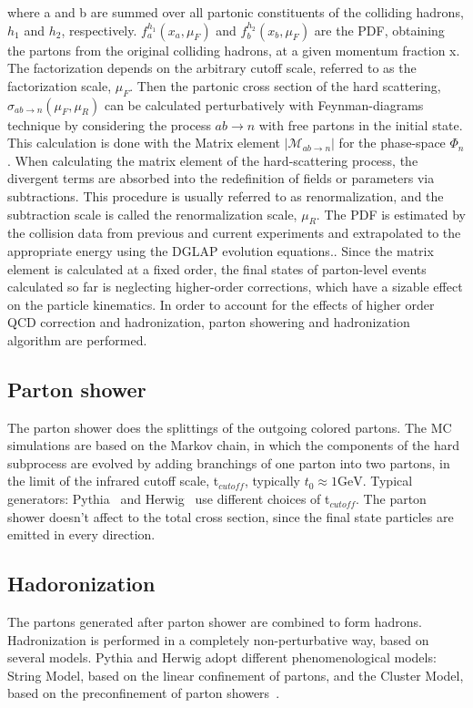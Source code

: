 where a and b are summed over all partonic constituents of the colliding hadrons, $h_1$ and $h_2$, respectively.
$f_{a}^{h_{1}}\left(x_{a}, \mu_{F}\right)$ and $f_{b}^{h_{2}}\left(x_{b}, \mu_{F}\right)$ are the PDF, obtaining the partons from the original colliding hadrons, at a given momentum fraction x. The factorization depends on the arbitrary cutoff scale, referred to as the factorization scale, $\mu_F$.
Then the partonic cross section of the hard scattering, $\hat{\sigma}_{a b \rightarrow n}\left(\mu_{F}, \mu_{R}\right)$ can be calculated perturbatively with Feynman-diagrams technique by considering the process $ab\rightarrow n $ with free partons in the initial state. This calculation is done with the Matrix element $\left|\mathcal{M}_{a b \rightarrow n}\right|$ for the phase-space $\Phi_n$.
When calculating the matrix element of the hard-scattering process, the divergent terms are absorbed into the redefinition of fields or parameters via subtractions. This procedure is usually referred to as renormalization, and the subtraction scale is called the renormalization scale, $\mu_R$. 
The PDF is estimated by the collision data from previous and current experiments and extrapolated to the appropriate energy using the DGLAP evolution equations.\cite{}.
Since the matrix element is calculated at a fixed order, the final states of parton-level events calculated so far is neglecting higher-order corrections, which have a sizable effect on the particle kinematics. In order to account for the effects of higher order QCD correction and hadronization, parton showering and hadronization algorithm are performed.

\subsection{Parton shower}
\label{subsec:partonshower}
The parton shower does the splittings of the outgoing colored partons.  The MC simulations are based on the Markov chain, in which the components of the hard subprocess are evolved by adding branchings of one parton into two partons, in the limit of the infrared cutoff scale, t$_{cutoff}$, typically $t_{0} \approx 1 \mathrm{GeV}$. 
Typical generators: Pythia~\cite{SJOSTRAND2008852} and Herwig~\cite{Gieseke2012} use different choices of t$_{cutoff}$.
The parton shower doesn't affect to the total cross section, since the final state particles are emitted in every direction.
\subsection{Hadoronization}
The partons generated after parton shower are combined to form hadrons. 
Hadronization is performed in a completely non-perturbative way, based on several models. 
Pythia and Herwig adopt different phenomenological models: String Model, based on the linear confinement of partons, and the Cluster Model, based on the preconfinement of parton showers~\cite{}.

